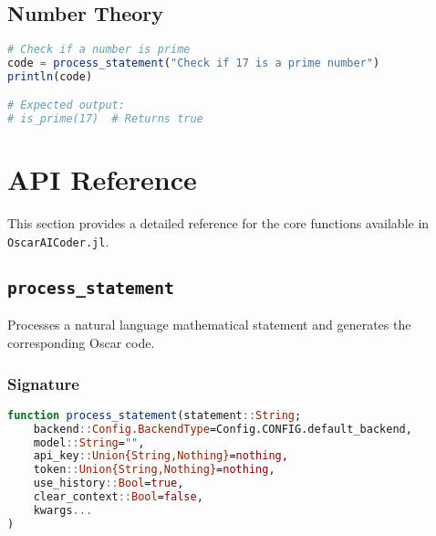 \documentclass[11pt,a4paper]{article}
\newcommand{\func}[1]{\texttt{#1}}
\newcommand{\modname}[1]{\texttt{#1}}
\begin{document}
\subsection{Number Theory}

\begin{lstlisting}[language=Julia]
# Check if a number is prime
code = process_statement("Check if 17 is a prime number")
println(code)

# Expected output:
# is_prime(17)  # Returns true
\end{lstlisting}

\section{API Reference}
\label{sec:api_reference}

This section provides a detailed reference for the core functions available in \modname{OscarAICoder.jl}.

\subsection{\func{process\_statement}}
\label{func:process_statement}

Processes a natural language mathematical statement and generates the corresponding Oscar code.

\subsubsection*{Signature}
\begin{lstlisting}[language=Julia]
function process_statement(statement::String; 
    backend::Config.BackendType=Config.CONFIG.default_backend,
    model::String="",
    api_key::Union{String,Nothing}=nothing,
    token::Union{String,Nothing}=nothing,
    use_history::Bool=true,
    clear_context::Bool=false,
    kwargs...
)
\end{lstlisting}
\end{document}
